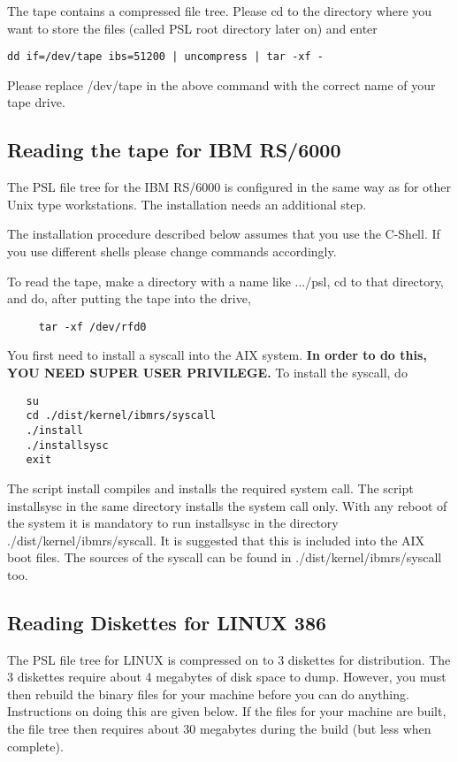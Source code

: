 The tape contains a compressed file tree. Please cd to the directory
where you want to store the files (called PSL root directory later on)
and enter 

\begin{verbatim}
dd if=/dev/tape ibs=51200 | uncompress | tar -xf -
\end{verbatim}

Please replace /dev/tape in the above command with the correct
name of your tape drive.

\subsection{Reading the tape for IBM RS/6000}

The PSL file tree for the IBM RS/6000 is configured in the same way as for
other Unix type workstations. The installation needs an additional
step.

The installation procedure described below assumes that you use the
C-Shell. If you use different shells please change commands accordingly.

To read the tape, make a directory with a name like .../psl, cd to that
directory, and do, after putting the tape into the drive, 

\begin{verbatim}
     tar -xf /dev/rfd0
\end{verbatim}

You first need to install a syscall into the AIX system. 
{\bf In order to do this, YOU NEED SUPER USER PRIVILEGE.}
To install the syscall, do
 
\begin{verbatim}
   su
   cd ./dist/kernel/ibmrs/syscall
   ./install
   ./installsysc
   exit
\end{verbatim}

The script install compiles and installs the required system call.
The script installsysc in the same directory installs the system call only.
With any reboot of the system it is mandatory to run installsysc in the
directory ./dist/kernel/ibmrs/syscall.
It is suggested that this is included into the AIX boot files. The sources
of the syscall can be found in ./dist/kernel/ibmrs/syscall  too.

\subsection{Reading Diskettes for LINUX 386}

The PSL file tree for LINUX is compressed on to 3 diskettes for
distribution. The 3 diskettes require about 4 megabytes of disk space to
dump.  However, you must then rebuild the binary files for your machine
before you can do anything. Instructions on doing this are given below.
If the files for your machine are built, the file tree then requires
about 30 megabytes during the build (but less when complete).

